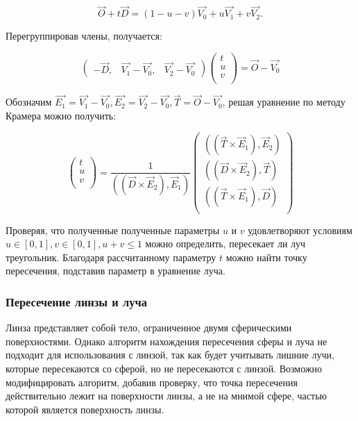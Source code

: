 \begin{equation}
	\vec{O} + t\vec{D} = (1-u-v)\vec{V_0} + u\vec{V_1} + v\vec{V_2}.
\end{equation}

Перегруппировав члены, получается:

\begin{equation}
	\begin{pmatrix}
	-\vec{D}, & \vec{V_1} - \vec{V_0}, & \vec{V_2} - \vec{V_0} 
	\end{pmatrix}
	\begin{pmatrix}
		t \\
		u \\
		v \\
	\end{pmatrix}
	= \vec{O} - \vec{V_0}
\end{equation}

Обозначим $\vec{E_1} = \vec{V_1} - \vec{V_0}, \vec{E_2} = \vec{V_2} - \vec{V_0}, \vec{T} = \vec{O} - \vec{V_0}$, решая уравнение по методу Крамера можно получить:

\begin{equation}
	\begin{pmatrix}
		t \\
		u \\
		v \\
	\end{pmatrix}
	=
	\frac{1}{((\vec{D} \times \vec{E}_2), \vec{E}_1)}
	\begin{pmatrix}
		((\vec{T} \times \vec{E}_1), \vec{E}_2) \\
		((\vec{D} \times \vec{E}_2), \vec{T}) \\
		((\vec{T} \times \vec{E}_1), \vec{D}) \\
	\end{pmatrix}
\end{equation}

Проверяя, что полученные полученные параметры $u$ и $v$ удовлетворяют условиям $u \in [0,1], v \in [0,1], u + v \leq 1$ можно определить, пересекает ли луч треугольник. Благодаря рассчитанному параметру $t$ можно найти точку пересечения, подставив параметр в уравнение луча.

\subsubsection{Пересечение линзы и луча}

Линза представляет собой тело, ограниченное двумя сферическими поверхностями. Однако алгоритм нахождения пересечения сферы и луча не подходит для использования с линзой, так как будет учитывать лишние лучи, которые пересекаются со сферой, но не пересекаются с линзой. Возможно модифицировать алгоритм, добавив проверку, что точка пересечения действительно лежит на поверхности линзы, а не на мнимой сфере, частью которой является поверхность линзы.

